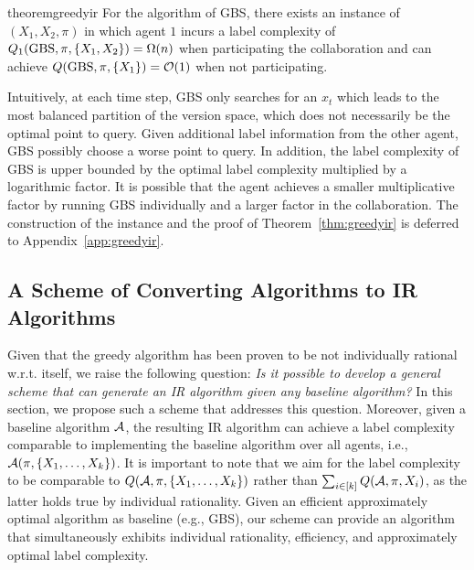 \begin{restatable}{theorem}{greedyir}\label{thm:greedyir}
For the algorithm of GBS, there exists an instance of $(X_1,X_2, \pi)$ in which agent $1$ incurs a label complexity of  $Q_1(\textrm{GBS},\pi, \{X_1,X_2\}) = \Omega(n)$ when participating the collaboration and can achieve $Q(\textrm{GBS},\pi, \{X_1\}) = \mathcal{O}(1)$ when not participating. %
\end{restatable}
Intuitively, at each time step, GBS only searches for an $x_t$ which leads to the most balanced partition of the version space, which does not necessarily be the optimal point to query. Given additional label information from the other agent, GBS possibly choose a worse point to query.
In addition, the label complexity of GBS is upper bounded by the optimal label complexity multiplied by a logarithmic factor.  It is possible that the agent achieves a smaller multiplicative factor by running GBS individually and a larger factor in the collaboration.
The construction of the instance and the proof of Theorem~\ref{thm:greedyir} is deferred to Appendix~\ref{app:greedyir}.


\subsection{A Scheme of Converting Algorithms to IR Algorithms}\label{subsec:ir-alg}
\vspace{-0.5em}

Given that the greedy algorithm has been proven to be not individually rational w.r.t. itself, we raise the following question: \emph{Is it possible to develop a general scheme that can generate an IR algorithm given any baseline algorithm?} In this section, we propose such a scheme that addresses this question. 
Moreover, given a baseline algorithm $\mathcal{A}$, the resulting IR algorithm can achieve a label complexity comparable to implementing the baseline algorithm over all agents, i.e., $\mathcal{A}(\pi, \{X_1,\ldots,X_k\})$.
It is important to note that we aim for the label complexity to be comparable to $Q(\mathcal{A},\pi, \{X_1,\ldots,X_k\})$ rather than $\sum_{i\in [k]} Q(\mathcal{A},\pi,{X_i})$, as the latter holds true by individual rationality.
Given an efficient approximately optimal algorithm as baseline (e.g., GBS), our scheme can provide an algorithm that simultaneously exhibits individual rationality, efficiency, and approximately optimal label complexity. 

